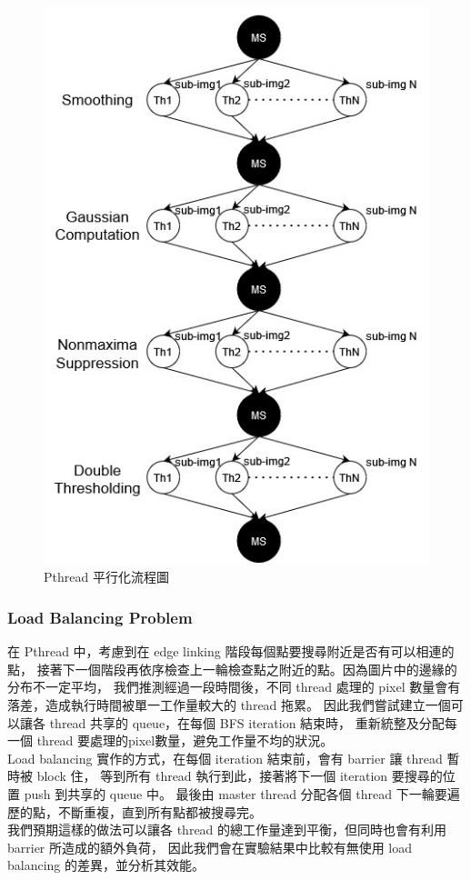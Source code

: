 \documentclass[sigconf,nonacm]{acmart}
\begin{document}
\begin{figure}[h]
  \centering
  \includegraphics[width=0.8\linewidth]{"./image/pthread_strategy.jpg"}
  \caption{Pthread 平行化流程圖}
  \label{fig:pthread}
\end{figure}

\subsubsection{Load Balancing Problem} \label{load_balancing}

在 Pthread 中，考慮到在 edge linking 階段每個點要搜尋附近是否有可以相連的點，
接著下一個階段再依序檢查上一輪檢查點之附近的點。因為圖片中的邊緣的分布不一定平均，
我們推測經過一段時間後，不同 thread 處理的 pixel 數量會有落差，造成執行時間被單一工作量較大的 thread 拖累。
因此我們嘗試建立一個可以讓各 thread 共享的 queue，在每個 BFS iteration 結束時，
重新統整及分配每一個 thread 要處理的pixel數量，避免工作量不均的狀況。 \\
Load balancing 實作的方式，在每個 iteration 結束前，會有 barrier 讓 thread 暫時被 block 住，
等到所有 thread 執行到此，接著將下一個 iteration 要搜尋的位置 push 到共享的 queue 中。
最後由 master thread 分配各個 thread 下一輪要遍歷的點，不斷重複，直到所有點都被搜尋完。 \\
我們預期這樣的做法可以讓各 thread 的總工作量達到平衡，但同時也會有利用 barrier 所造成的額外負荷，
因此我們會在實驗結果中比較有無使用 load balancing 的差異，並分析其效能。
\end{document}
